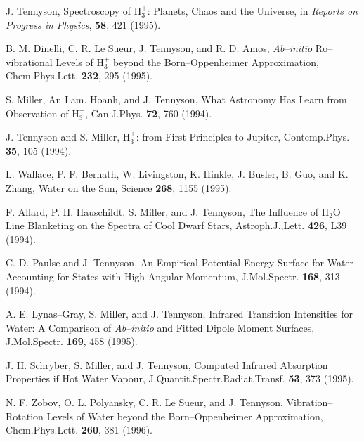 \begin{thebibliography}{999}
J. Tennyson, 
Spectroscopy of H$_3^+$: Planets, Chaos and the Universe,
in {\em Reports on Progress in Physics}, {\bf 58},
421 (1995).

B. M. Dinelli, C. R. Le Sueur, J. Tennyson, and R. D. Amos,
{\it Ab--initio} Ro--vibrational Levels of H$_3^+$ beyond the
Born--Oppenheimer Approximation,
Chem.Phys.Lett. {\bf 232}, 295 (1995).

S. Miller, An Lam. Hoanh, and J. Tennyson,
What Astronomy Has Learn from Observation of H$_3^+$,
Can.J.Phys. {\bf 72}, 760 (1994).

J. Tennyson and S. Miller, 
H$_3^+$: from First Principles to Jupiter,
Contemp.Phys. {\bf 35}, 105 (1994).


L. Wallace, P. F. Bernath, W. Livingston, K. Hinkle, J. Busler,
B. Guo, and K. Zhang, 
Water on the Sun,
Science {\bf 268}, 1155 (1995).

F. Allard, P. H. Hauschildt, S. Miller, and J. Tennyson,
The Influence of H$_2$O Line Blanketing on the Spectra of
Cool Dwarf Stars,
Astroph.J.,Lett. {\bf 426}, L39 (1994).

C. D. Paulse and J. Tennyson, 
An Empirical Potential Energy Surface for Water Accounting for
States with High Angular Momentum,
J.Mol.Spectr. {\bf 168}, 313 (1994).

A. E. Lynas--Gray, S. Miller, and J. Tennyson,
Infrared Transition Intensities for Water: A Comparison of
{\it Ab--initio} and Fitted Dipole Moment Surfaces,
J.Mol.Spectr. {\bf 169}, 458 (1995).

J. H. Schryber, S. Miller, and J. Tennyson,
Computed Infrared Absorption Properties if Hot Water Vapour,
J.Quantit.Spectr.Radiat.Transf. {\bf 53}, 373 (1995).


N. F. Zobov, O. L. Polyansky, C. R. Le Sueur, and J. Tennyson,
Vibration--Rotation Levels of Water beyond the 
Born--Oppenheimer Approximation,
Chem.Phys.Lett. {\bf 260}, 381 (1996).



%
%
%
%


\end{thebibliography}

